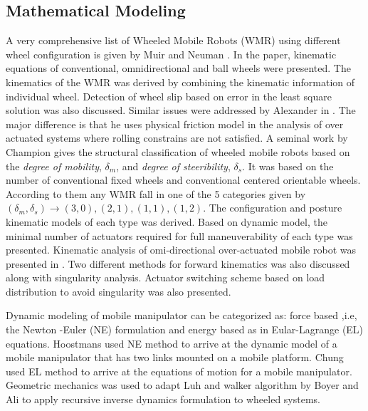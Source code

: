 \subsection{Mathematical Modeling}
A very comprehensive list of Wheeled Mobile Robots (WMR) using different wheel configuration is given by Muir and Neuman \cite{muir1987kinematic}. In the paper, kinematic equations of conventional, omnidirectional and ball wheels were presented. The kinematics of the WMR was derived by combining the kinematic information of   individual wheel. Detection of wheel slip based on  error in the least square solution was also discussed. Similar issues were addressed by Alexander in \cite{alexander1989kinematics}. The major difference is that he uses physical friction model in the analysis of over actuated systems where rolling constrains are not satisfied. A seminal work by Champion \cite{campion1996structural} gives the structural classification of wheeled mobile robots based on the \textit{degree of mobility}, $\delta_m$, and \textit{degree of steeribility}, $\delta_s$. It was based on the number of conventional fixed wheels and  conventional centered orientable wheels. According to them any WMR fall in one of the 5 categories given by $(\delta_m,\delta_s)\rightarrow(3,0),(2,1),(1,1),(1,2)$. 
The configuration and posture kinematic models of each type was derived. Based on  dynamic model, the minimal number of actuators required for full maneuverability of each type was presented. Kinematic analysis of omi-directional over-actuated mobile robot  was presented in \cite{yi2002kinematics}. Two different methods for forward kinematics was also discussed along with  singularity analysis. Actuator switching scheme based on load distribution to avoid singularity was also presented. 

Dynamic modeling of mobile manipulator can be categorized as: force based ,i.e, the Newton -Euler (NE) formulation and  energy based as in Eular-Lagrange (EL) equations. Hoostmans \cite{hootsmans1992motion} used NE method to arrive at  the dynamic model of a mobile manipulator that has two links mounted on a mobile platform. Chung \cite{chung1998interaction} used EL method to arrive at the equations of motion for a mobile manipulator. Geometric mechanics was used to adapt Luh and walker \cite{luh1980line} algorithm  by Boyer and Ali \cite{boyer2011recursive} to apply recursive inverse dynamics formulation to wheeled systems.   

